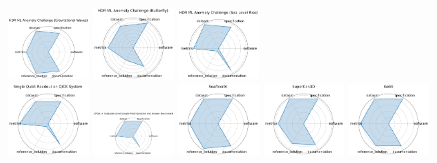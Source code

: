 \begin{figure}[ht!]
\includegraphics[width=0.1900\textwidth]{images/hdr_ml_anomaly_challenge_gravitational_waves_radar.pdf}
\includegraphics[width=0.1900\textwidth]{images/hdr_ml_anomaly_challenge_butterfly_radar.pdf}
\includegraphics[width=0.1900\textwidth]{images/hdr_ml_anomaly_challenge_sea_level_rise_radar.pdf}
\\[1ex]
\includegraphics[width=0.1900\textwidth]{images/single_qubit_readout_on_qick_system_radar.pdf}
\includegraphics[width=0.1900\textwidth]{images/gpqa_a_graduate-level_google-proof_question_and_answer_benchmark_radar.pdf}
\includegraphics[width=0.1900\textwidth]{images/seafloorai_radar.pdf}
\includegraphics[width=0.1900\textwidth]{images/supercond_radar.pdf}
\includegraphics[width=0.1900\textwidth]{images/gess_radar.pdf}

\end{figure}
